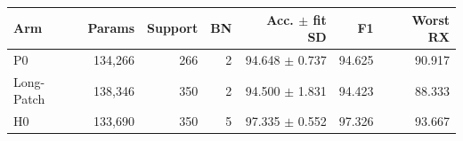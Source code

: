 \begin{tabular}{lrrrrrr}
\toprule Arm & Params & Support & BN & Acc. $\pm$ fit SD & F1 & Worst RX\\\midrule
P0&134,266&266&2&94.648 $\pm$ 0.737&94.625&90.917\\
Long-Patch&138,346&350&2&94.500 $\pm$ 1.831&94.423&88.333\\
H0&133,690&350&5&97.335 $\pm$ 0.552&97.326&93.667\\
\bottomrule\end{tabular}
